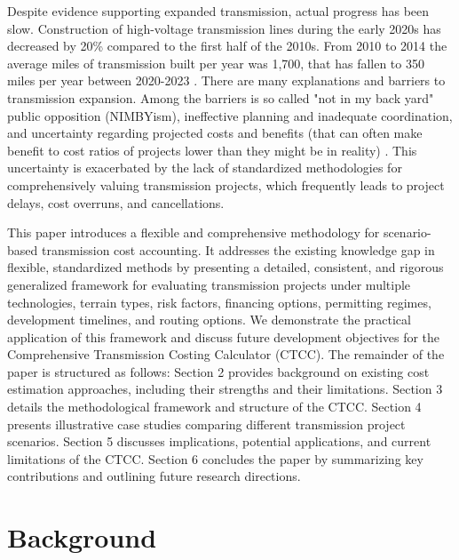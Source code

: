 \documentclass[11pt,twocolumn,a4paper]{article}
\begin{document}
Despite evidence supporting expanded transmission, actual progress has been slow. Construction of high-voltage transmission lines during the early 2020s has decreased by 20\% compared to the first half of the 2010s. From 2010 to 2014 the average miles of transmission built per year was 1,700, that has fallen to 350 miles per year between 2020-2023 \parencite{FEWERMILES2024}. There are many explanations and barriers to transmission expansion. Among the barriers is so called "not in my back yard" public opposition (NIMBYism), ineffective planning and inadequate coordination, and uncertainty regarding projected costs and benefits (that can often make benefit to cost ratios of projects lower than they might be in reality) \parencite{joskowFacilitatingTransmissionExpansion2022}. This uncertainty is exacerbated by the lack of standardized methodologies for comprehensively valuing transmission projects, which frequently leads to project delays, cost overruns, and cancellations.


This paper introduces a flexible and comprehensive methodology for scenario-based transmission cost accounting. It addresses the existing knowledge gap in flexible, standardized methods by presenting a detailed, consistent, and rigorous generalized framework for evaluating transmission projects under multiple technologies, terrain types, risk factors, financing options, permitting regimes, development timelines, and routing options. We demonstrate the practical application of this framework and discuss future development objectives for the Comprehensive Transmission Costing Calculator (CTCC). The remainder of the paper is structured as follows: Section 2 provides background on existing cost estimation approaches, including their strengths and their limitations. Section 3 details the methodological framework and structure of the CTCC. Section 4 presents illustrative case studies comparing different transmission project scenarios. Section 5 discusses implications, potential applications, and current limitations of the CTCC. Section 6 concludes the paper by summarizing key contributions and outlining future research directions.

\section{Background}
\end{document}
